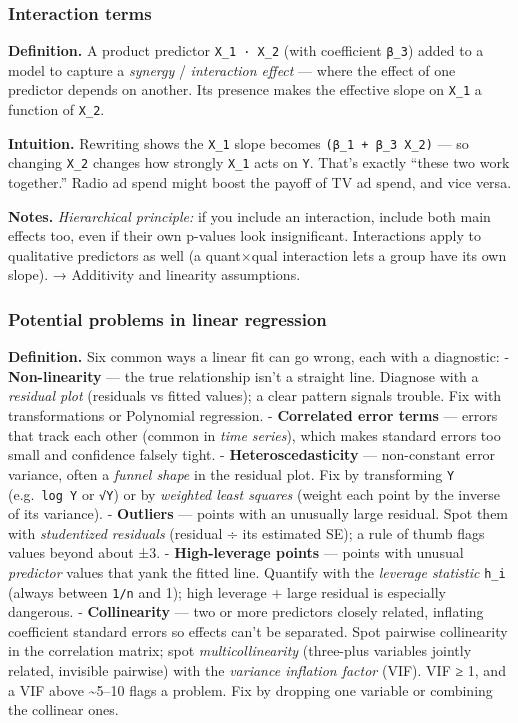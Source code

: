 \documentclass[
  10pt,
  letterpaper,
  onecolumn]{article}
\begin{document}
\hypertarget{interaction-terms}{%
\subsubsection{Interaction terms}\label{interaction-terms}}

\textbf{Definition.} A product predictor \texttt{X\_1\ ·\ X\_2} (with
coefficient \texttt{β\_3}) added to a model to capture a \emph{synergy}
/ \emph{interaction effect} --- where the effect of one predictor
depends on another. Its presence makes the effective slope on
\texttt{X\_1} a function of \texttt{X\_2}.

\textbf{Intuition.} Rewriting shows the \texttt{X\_1} slope becomes
\texttt{(β\_1\ +\ β\_3\ X\_2)} --- so changing \texttt{X\_2} changes how
strongly \texttt{X\_1} acts on \texttt{Y}. That's exactly ``these two
work together.'' Radio ad spend might boost the payoff of TV ad spend,
and vice versa.

\textbf{Notes.} \emph{Hierarchical principle:} if you include an
interaction, include both main effects too, even if their own p-values
look insignificant. Interactions apply to qualitative predictors as well
(a quant×qual interaction lets a group have its own slope). → Additivity
and linearity assumptions.

\hypertarget{potential-problems-in-linear-regression}{%
\subsubsection{Potential problems in linear
regression}\label{potential-problems-in-linear-regression}}

\textbf{Definition.} Six common ways a linear fit can go wrong, each
with a diagnostic: - \textbf{Non-linearity} --- the true relationship
isn't a straight line. Diagnose with a \emph{residual plot} (residuals
vs fitted values); a clear pattern signals trouble. Fix with
transformations or Polynomial regression. - \textbf{Correlated error
terms} --- errors that track each other (common in \emph{time series}),
which makes standard errors too small and confidence falsely tight. -
\textbf{Heteroscedasticity} --- non-constant error variance, often a
\emph{funnel shape} in the residual plot. Fix by transforming \texttt{Y}
(e.g.~\texttt{log\ Y} or \texttt{√Y}) or by \emph{weighted least
squares} (weight each point by the inverse of its variance). -
\textbf{Outliers} --- points with an unusually large residual. Spot them
with \emph{studentized residuals} (residual ÷ its estimated SE); a rule
of thumb flags values beyond about ±3. - \textbf{High-leverage points}
--- points with unusual \emph{predictor} values that yank the fitted
line. Quantify with the \emph{leverage statistic} \texttt{h\_i} (always
between \texttt{1/n} and 1); high leverage + large residual is
especially dangerous. - \textbf{Collinearity} --- two or more predictors
closely related, inflating coefficient standard errors so effects can't
be separated. Spot pairwise collinearity in the correlation matrix; spot
\emph{multicollinearity} (three-plus variables jointly related,
invisible pairwise) with the \emph{variance inflation factor} (VIF). VIF
≥ 1, and a VIF above \textasciitilde5--10 flags a problem. Fix by
dropping one variable or combining the collinear ones.
\end{document}
